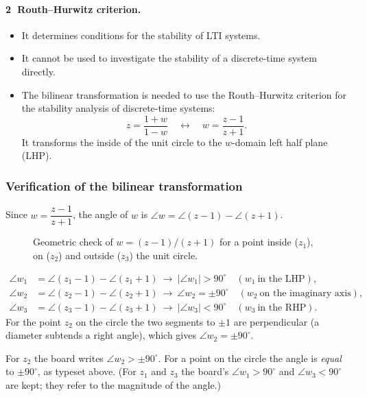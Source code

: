 \paragraph{\textcircled{2} Routh--Hurwitz criterion.}
\begin{itemize}
  \item It determines conditions for the stability of LTI systems.
  \item It cannot be used to investigate the stability of a discrete-time system directly.
  \item The bilinear transformation is needed to use the Routh--Hurwitz criterion for the stability analysis of
        discrete-time systems:
        \begin{equation}\label{eq:bilinear}
          z=\frac{1+w}{1-w}\quad\longleftrightarrow\quad w=\frac{z-1}{z+1}.
        \end{equation}
        It transforms the inside of the unit circle to the $w$-domain left half plane (LHP).
\end{itemize}

\subsubsection*{Verification of the bilinear transformation}
Since $w=\dfrac{z-1}{z+1}$, the angle of $w$ is $\angle w=\angle(z-1)-\angle(z+1)$.
\begin{figure}[ht]
\centering
\resizebox{0.98\linewidth}{!}{\figBilinear}
\caption{Geometric check of $w=(z-1)/(z+1)$ for a point inside ($z_1$), on ($z_2$) and outside ($z_3$) the unit
circle.}\label{fig:bilinear}
\end{figure}
\begin{align*}
  \angle w_1&=\angle(z_1-1)-\angle(z_1+1)\ \to\ |\angle w_1|>90^{\circ}\quad(w_1\ \text{in the LHP}),\\
  \angle w_2&=\angle(z_2-1)-\angle(z_2+1)\ \to\ \angle w_2=\pm90^{\circ}\quad(w_2\ \text{on the imaginary axis}),\\
  \angle w_3&=\angle(z_3-1)-\angle(z_3+1)\ \to\ |\angle w_3|<90^{\circ}\quad(w_3\ \text{in the RHP}).
\end{align*}
For the point $z_2$ on the circle the two segments to $\pm1$ are perpendicular (a diameter subtends a right
angle), which gives $\angle w_2=\pm90^{\circ}$.

\begin{boardnote}
For $z_2$ the board writes $\angle w_2>\pm90^{\circ}$. For a point on the circle the angle is \emph{equal} to
$\pm90^{\circ}$, as typeset above. (For $z_1$ and $z_3$ the board's $\angle w_1>90^{\circ}$ and
$\angle w_3<90^{\circ}$ are kept; they refer to the magnitude of the angle.)
\end{boardnote}

